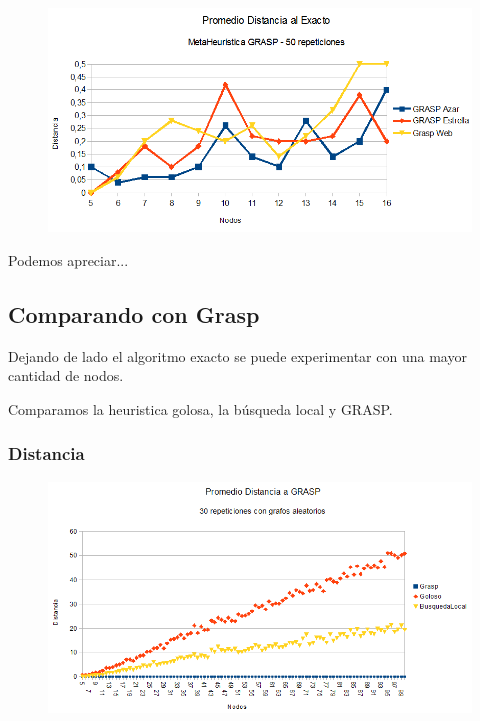 \begin{figure}[H]
	\centering
	\includegraphics[scale=0.6]{distancia-GRASP.png}
\end{figure}

\quad Podemos apreciar...

\quad


\quad



\subsection{Comparando con Grasp}

\quad Dejando de lado el algoritmo exacto se puede experimentar con una mayor cantidad de nodos.

\quad Comparamos la heuristica golosa, la búsqueda local y GRASP.

\quad 

\subsubsection{Distancia}

\begin{figure}[H]
	\centering
	\includegraphics[scale=0.6]{distancia-Grasp-Azar.png}
\end{figure}

